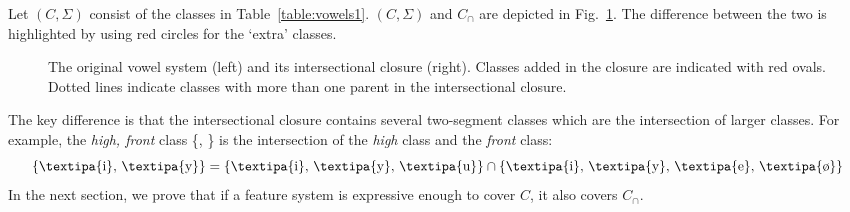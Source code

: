 \documentclass[12pt, oneside]{article}   	%
\begin{document}
Let $(C, \Sigma)$ consist of the classes in Table~\ref{table:vowels1}. $(C, \Sigma)$ and $C_\cap$ are depicted in Fig.~\ref{fig:vowel_inventory}. The difference between the two is highlighted by using red circles for the `extra' classes.

\begin{figure}[h]
  \centering
  \qquad
  \caption{The original vowel system (left) and its intersectional closure (right). Classes added in the closure are indicated with red ovals. Dotted lines indicate classes with more than one parent in the intersectional closure.}
  \label{fig:vowel_inventory}
\end{figure}

%

The key difference is that the intersectional closure contains several two-segment classes which are the intersection of larger classes. For example, the \textit{high, front} class \{, \} is the intersection of the \textit{high} class and the \textit{front} class:
$$ \text{\{\textipa{i}, \textipa{y}\}} = \text{\{\textipa{i}, \textipa{y}, \textipa{u}\}} \cap \text{\{\textipa{i}, \textipa{y}, \textipa{e}, \textipa{\o}\}} $$
In the next section, we prove that if a feature system is expressive enough to cover $C$, it also covers $C_\cap$.
\end{document}
